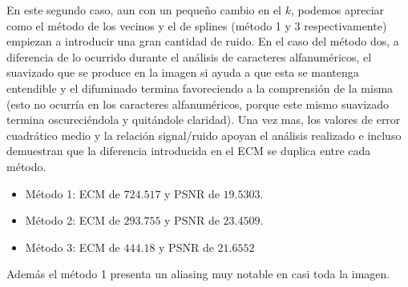 En este segundo caso, aun con un pequeño cambio en el $k$, podemos apreciar como el método de los vecinos y el de splines (método 1 y 3 respectivamente) empiezan a introducir una gran cantidad de ruido. En el caso del método dos, a diferencia de lo ocurrido durante el análisis de caracteres alfanuméricos, el suavizado que se produce en la imagen si ayuda a que esta se mantenga entendible y el difuminado termina favoreciendo a la comprensión de la misma (esto no ocurría en los caracteres alfanuméricos, porque este mismo suavizado termina oscureciéndola y quitándole claridad).
Una vez mas, los valores de error cuadrático medio y la relación signal/ruido apoyan el análisis realizado e incluso demuestran que la diferencia introducida en el ECM se duplica entre cada método.

\begin{itemize}
 \item Método 1: ECM de $724.517$ y PSNR de $19.5303$.
 \item Método 2: ECM de $293.755$ y PSNR de $23.4509$.
 \item Método 3: ECM de $444.18$ y PSNR de $21.6552$
\end{itemize}

Además el método 1 presenta un aliasing muy notable en casi toda la imagen.

